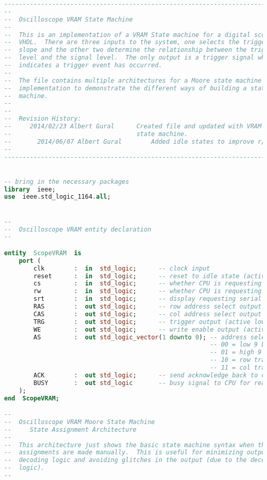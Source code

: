 \begin{lstlisting}[language=vhdl]
----------------------------------------------------------------------------
--
--  Oscilloscope VRAM State Machine
--
--  This is an implementation of a VRAM State machine for a digital scope in
--  VHDL.  There are three inputs to the system, one selects the trigger
--  slope and the other two determine the relationship between the trigger
--  level and the signal level.  The only output is a trigger signal which
--  indicates a trigger event has occurred.
--
--  The file contains multiple architectures for a Moore state machine
--  implementation to demonstrate the different ways of building a state
--  machine.
--
--
--  Revision History:
--     2014/02/23 Albert Gural      Created file and updated with VRAM
--                                  state machine.
--		 2014/06/07 Albert Gural		Added idle states to improve r/w speeds.
--
----------------------------------------------------------------------------


-- bring in the necessary packages
library  ieee;
use  ieee.std_logic_1164.all;


--
--  Oscilloscope VRAM entity declaration
--

entity  ScopeVRAM  is
    port (
        clk        :  in  std_logic;      -- clock input
        reset      :  in  std_logic;      -- reset to idle state (active low)
        cs         :  in  std_logic;      -- whether CPU is requesting R/W (active low)
        rw         :  in  std_logic;      -- whether CPU is requesting R or W
        srt        :  in  std_logic;      -- display requesting serial row transfer
        RAS        :  out std_logic;      -- row address select output
        CAS        :  out std_logic;      -- col address select output
        TRG        :  out std_logic;      -- trigger output (active low)
        WE         :  out std_logic;      -- write enable output (active low)
        AS         :  out std_logic_vector(1 downto 0); -- address select
                                                        -- 00 = low 9 bits
                                                        -- 01 = high 9 bits
                                                        -- 10 = row transfer
                                                        -- 11 = col transfer (0)
        ACK        :  out std_logic;      -- send acknowledge back to display driver
        BUSY       :  out std_logic       -- busy signal to CPU for read/write
    );
end  ScopeVRAM;

--
--  Oscilloscope VRAM Moore State Machine
--     State Assignment Architecture
--
--  This architecture just shows the basic state machine syntax when the state
--  assignments are made manually.  This is useful for minimizing output
--  decoding logic and avoiding glitches in the output (due to the decoding
--  logic).
--


\end{lstlisting}
